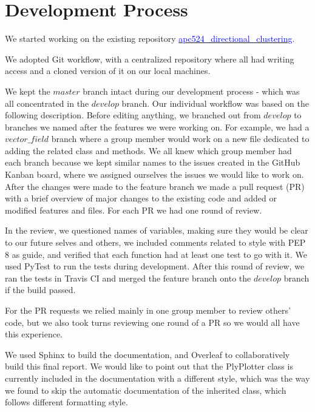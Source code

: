 \documentclass[11pt]{article}
\begin{document}
\section{Development Process}
\label{section:development}

We started working on the existing repository  \href{https://github.com/arpastrana/apc524_directional_clustering}{\textcolor{blue}{apc524\_directional\_clustering}}.

We adopted Git workflow, with a centralized repository where all had writing access and a cloned version of it on our local machines. 

We kept the $master$ branch intact during our development process - which was all concentrated in the $develop$ branch. Our individual workflow was based on the following description. Before editing anything, we branched out from $develop$ to branches we named after the features we were working on. For example, we had a $vector\_field$ branch where a group member would work on a new file dedicated to adding the related class and methods. We all knew which group member had each branch because we kept similar names to the issues created in the GitHub Kanban board, where we assigned ourselves the issues we would like to work on. 
After the changes were made to the feature branch we made a pull request (PR) with a brief overview of major changes to the existing code and added or modified features and files. For each PR we had one round of review.

In the review, we questioned names of variables, making sure they would be clear to our future selves and others, we included comments related to style with PEP 8 as guide, and verified that each function had at least one test to go with it. We used PyTest to run the tests during development. After this round of review, we ran the tests in Travis CI and merged the feature branch onto the $develop$ branch if the build passed.

For the PR requests we relied mainly in one group member to review others' code, but we also took turns reviewing one round of a PR so we would all have this experience. 

We used Sphinx to build the documentation, and Overleaf to collaboratively build this final report. We would like to point out that the PlyPlotter class is currently included in the documentation with a different style, which was the way we found to skip the automatic documentation of the inherited class, which follows different formatting style.
\end{document}
